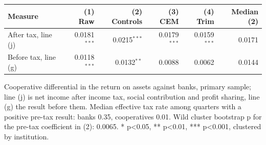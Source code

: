 \footnotesize
\setlength{\tabcolsep}{4pt}
\begin{tabular}{lrrrrr}
\toprule
Measure & (1) Raw & (2) Controls & (3) CEM & (4) Trim & Median (2) \\
\midrule
After tax, line (j) & 0.0181$^{***}$ & 0.0215$^{***}$ & 0.0179$^{***}$ & 0.0159$^{***}$ & 0.0171 \\
Before tax, line (g) & 0.0118$^{***}$ & 0.0132$^{**}$ & 0.0088 & 0.0062 & 0.0144 \\
\bottomrule
\end{tabular}
\begin{tablenotes}[flushleft]\footnotesize
\item Cooperative differential in the return on assets against banks, primary sample; line (j) is net income after income tax, social contribution and profit sharing, line (g) the result before them. Median effective tax rate among quarters with a positive pre-tax result: banks 0.35, cooperatives 0.01. Wild cluster bootstrap p for the pre-tax coefficient in (2): 0.0065. * p<0.05, ** p<0.01, *** p<0.001, clustered by institution.
\end{tablenotes}
